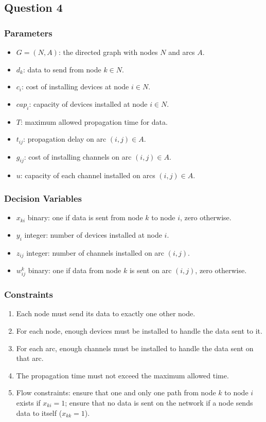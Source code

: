 \subsection*{Question 4}

\subsubsection*{Parameters}

\begin{itemize}
	\item $G = (N, A)$: the directed graph with nodes $N$ and arcs $A$.
	\item $d_k$: data to send from node $k \in N$.
	\item $c_i$: cost of installing devices at node $i \in N$.
	\item $cap_i$: capacity of devices installed at node $i \in N$.
	\item $T$: maximum allowed propagation time for data.
	\item $t_{ij}$: propagation delay on arc $(i, j) \in A$.
	\item $g_{ij}$: cost of installing channels on arc $(i, j) \in A$.
	\item $u$: capacity of each channel installed on arcs $(i, j) \in A$.
\end{itemize}

\subsubsection*{Decision Variables}

\begin{itemize}
	\item $x_{ki}$ binary: one if data is sent from node $k$ to node $i$, zero otherwise.
	\item $y_i$ integer: number of devices installed at node $i$.
	\item $z_{ij}$ integer: number of channels installed on arc $(i, j)$.
	\item $w_{ij}^k$ binary: one if data from node $k$ is sent on arc $(i, j)$, zero otherwise.
\end{itemize}

\subsubsection*{Constraints}

\begin{enumerate}
	\item Each node must send its data to exactly one other node.
	\item For each node, enough devices must be installed to handle the data sent to it.
	\item For each arc, enough channels must be installed to handle the data sent on that arc.
	\item The propagation time must not exceed the maximum allowed time.
	\item Flow constraints: ensure that one and only one path from node $k$ to node $i$ exists if $x_{ki} = 1$; ensure that no data is sent on the network if a node sends data to itself ($x_{kk} = 1$).
\end{enumerate}

